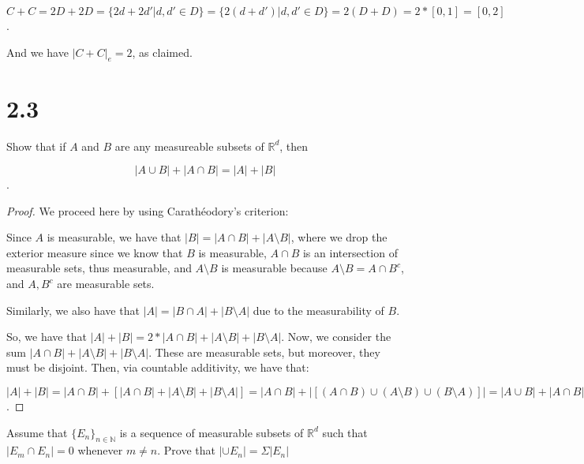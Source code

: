 \documentclass[10pt]{article}
\newenvironment{problem}[2][Problem]{\begin{trivlist}
\item[\hskip \labelsep {\bfseries #1}\hskip \labelsep {\bfseries #2.}]}{\end{trivlist}}
\begin{document}
$$ C+ C = 2D + 2D = \{ 2d + 2d' | d,d' \in D \} = \{ 2 (d + d') | d, d' \in D \} = 2 ( D + D ) = 2 * [0,1] = [0,2] $$.

And we have $|C + C|_e = 2$, as claimed.

\section*{2.3}

\begin{problem}{2.2.32}
Show that if $A$ and $B$ are any measureable subsets of $\mathbb{R}^d$, then

$$ | A \cup B | + | A \cap B | = |A| + |B| $$.
\end{problem}

\begin{proof}[Proof]
We proceed here by using Carath\'eodory's criterion:

Since $A$ is measurable, we have that $|B| = |A \cap B| + | A \setminus B |$, where we drop the exterior measure since we know that $B$ is measurable, $A \cap B$ is an intersection of measurable sets, thus measurable, and $A \setminus B$ is measurable because  $A \setminus B = A \cap B^c$, and $A, B^c$ are measurable sets.

Similarly, we also have that $|A| = |B \cap A| + |B \setminus A|$ due to the measurability of $B$.

So, we have that $|A| + |B| = 2 * |A \cap B | + |A \setminus B | + |B \setminus A|$. Now, we consider the sum $|A \cap B| + |A \setminus B| + |B \setminus A|$. These are measurable sets, but moreover, they must be disjoint. Then, via countable additivity, we have that:

 $$|A| + |B| = |A \cap B | + [| A \cap B | + |A \setminus B | + |B \setminus A|] = |A \cap B| + | [ (A \cap B) \cup (A \setminus B) \cup (B \setminus A)] | = | A \cup B | + | A \cap B | $$.
\end{proof}

\begin{problem}{2.2.33}
Assume that $\{E_n\}_{n \in \mathbb{N}}$ is a sequence of measurable subsets of $\mathbb{R}^d$ such that $|E_m \cap E_n| = 0$ whenever $m \not = n$. Prove that $|\cup E_n| = \Sigma | E_n | $
\end{problem}
\end{document}
